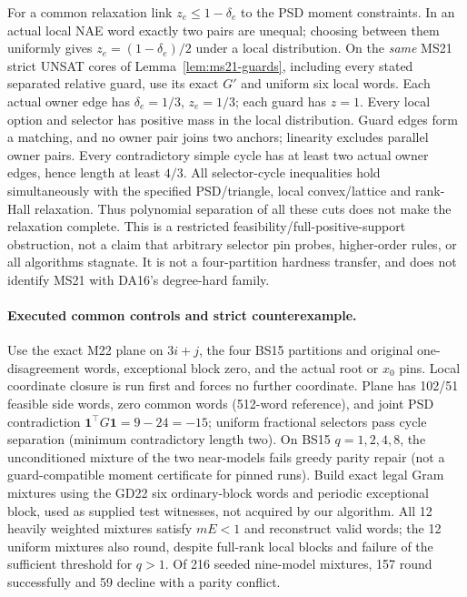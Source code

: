 \documentclass[11pt]{article}
\begin{document}
For a common relaxation link $z_e\le1-\delta_e$ to the PSD moment constraints. In an actual local NAE word exactly two pairs are unequal; choosing between them uniformly gives $z_e=(1-\delta_e)/2$ under a local distribution. On the \emph{same} MS21 strict UNSAT cores of Lemma~\ref{lem:ms21-guards}, including every stated separated relative guard, use its exact $G'$ and uniform six local words. Each actual owner edge has $\delta_e=1/3$, $z_e=1/3$; each guard has $z=1$. Every local option and selector has positive mass in the local distribution. Guard edges form a matching, and no owner pair joins two anchors; linearity excludes parallel owner pairs. Every contradictory simple cycle has at least two actual owner edges, hence length at least $4/3$. All selector-cycle inequalities hold simultaneously with the specified PSD/triangle, local convex/lattice and rank-Hall relaxation. Thus polynomial separation of all these cuts does not make the relaxation complete. This is a restricted feasibility/full-positive-support obstruction, not a claim that arbitrary selector pin probes, higher-order rules, or all algorithms stagnate. It is not a four-partition hardness transfer, and does not identify MS21 with DA16's degree-hard family.

\paragraph{Executed common controls and strict counterexample.}
Use the exact M22 plane on $3i+j$, the four BS15 partitions and original one-disagreement words, exceptional block zero, and the actual root or $x_0$ pins. Local coordinate closure is run first and forces no further coordinate. Plane has 102/51 feasible side words, zero common words (512-word reference), and joint PSD contradiction $\mathbf1^\top G\mathbf1=9-24=-15$; uniform fractional selectors pass cycle separation (minimum contradictory length two). On BS15 $q=1,2,4,8$, the unconditioned mixture of the two near-models fails greedy parity repair (not a guard-compatible moment certificate for pinned runs). Build exact legal Gram mixtures using the GD22 six ordinary-block words and periodic exceptional block, used as supplied test witnesses, not acquired by our algorithm. All 12 heavily weighted mixtures satisfy $mE<1$ and reconstruct valid words; the 12 uniform mixtures also round, despite full-rank local blocks and failure of the sufficient threshold for $q>1$. Of 216 seeded nine-model mixtures, 157 round successfully and 59 decline with a parity conflict.
\end{document}
